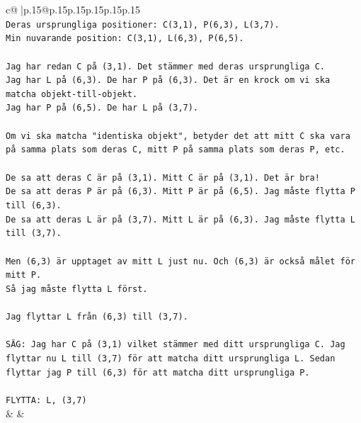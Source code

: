 \documentclass{article}
\begin{document}
{\begin{supertabular}{c@{$\;$}|p{.15\linewidth}@{}p{.15\linewidth}p{.15\linewidth}p{.15\linewidth}p{.15\linewidth}p{.15\linewidth}}
{{{\\ 
\texttt{Deras ursprungliga positioner: C(3,1), P(6,3), L(3,7).} \\
\texttt{Min nuvarande position: C(3,1), L(6,3), P(6,5).} \\
\\ 
\texttt{Jag har redan C på (3,1). Det stämmer med deras ursprungliga C.} \\
\texttt{Jag har L på (6,3). De har P på (6,3). Det är en krock om vi ska matcha objekt{-}till{-}objekt.} \\
\texttt{Jag har P på (6,5). De har L på (3,7).} \\
\\ 
\texttt{Om vi ska matcha "identiska objekt", betyder det att mitt C ska vara på samma plats som deras C, mitt P på samma plats som deras P, etc.} \\
\\ 
\texttt{De sa att deras C är på (3,1). Mitt C är på (3,1). Det är bra!} \\
\texttt{De sa att deras P är på (6,3). Mitt P är på (6,5). Jag måste flytta P till (6,3).} \\
\texttt{De sa att deras L är på (3,7). Mitt L är på (6,3). Jag måste flytta L till (3,7).} \\
\\ 
\texttt{Men (6,3) är upptaget av mitt L just nu. Och (6,3) är också målet för mitt P.} \\
\texttt{Så jag måste flytta L först.} \\
\\ 
\texttt{Jag flyttar L från (6,3) till (3,7).} \\
\\ 
\texttt{SÄG: Jag har C på (3,1) vilket stämmer med ditt ursprungliga C. Jag flyttar nu L till (3,7) för att matcha ditt ursprungliga L. Sedan flyttar jag P till (6,3) för att matcha ditt ursprungliga P.} \\
\\ 
\texttt{FLYTTA: L, (3,7)} \\
            }
        }
    }
    & & \\ \\


\end{supertabular}}
\end{document}
